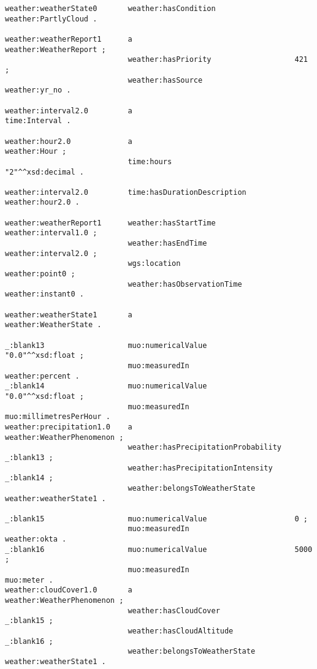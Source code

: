 \begin{lstlisting}
weather:weatherState0       weather:hasCondition                  weather:PartlyCloud .

weather:weatherReport1      a                                     weather:WeatherReport ;
                            weather:hasPriority                   421 ;
                            weather:hasSource                     weather:yr_no .

weather:interval2.0         a                                     time:Interval .

weather:hour2.0             a                                     weather:Hour ;
                            time:hours                            "2"^^xsd:decimal .

weather:interval2.0         time:hasDurationDescription           weather:hour2.0 .

weather:weatherReport1      weather:hasStartTime                  weather:interval1.0 ;
                            weather:hasEndTime                    weather:interval2.0 ;
                            wgs:location                          weather:point0 ;
                            weather:hasObservationTime            weather:instant0 .

weather:weatherState1       a                                     weather:WeatherState .

_:blank13                   muo:numericalValue                    "0.0"^^xsd:float ;
                            muo:measuredIn                        weather:percent .
_:blank14                   muo:numericalValue                    "0.0"^^xsd:float ;
                            muo:measuredIn                        muo:millimetresPerHour .
weather:precipitation1.0    a                                     weather:WeatherPhenomenon ;
                            weather:hasPrecipitationProbability   _:blank13 ;
                            weather:hasPrecipitationIntensity     _:blank14 ;
                            weather:belongsToWeatherState         weather:weatherState1 .

_:blank15                   muo:numericalValue                    0 ;
                            muo:measuredIn                        weather:okta .
_:blank16                   muo:numericalValue                    5000 ;
                            muo:measuredIn                        muo:meter .
weather:cloudCover1.0       a                                     weather:WeatherPhenomenon ;
                            weather:hasCloudCover                 _:blank15 ;
                            weather:hasCloudAltitude              _:blank16 ;
                            weather:belongsToWeatherState         weather:weatherState1 .


\end{lstlisting}
